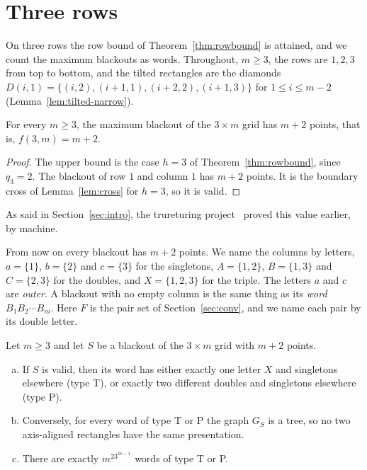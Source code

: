 \section{Three rows}\label{sec:three}

On three rows the row bound of Theorem~\ref{thm:rowbound} is attained, and we count the
maximum blackouts as words. Throughout, $m\ge3$, the rows are $1,2,3$ from top to bottom, and the
tilted rectangles are the diamonds $D(i,1)=\{(i,2),(i+1,1),(i+2,2),(i+1,3)\}$ for
$1\le i\le m-2$ (Lemma~\ref{lem:tilted-narrow}).

\begin{theorem}\label{thm:threevalue}
For every $m\ge3$, the maximum blackout of the $3\times m$ grid has $m+2$ points, that is,
$f(3,m)=m+2$.
\end{theorem}

\begin{proof}
The upper bound is the case $h=3$ of Theorem~\ref{thm:rowbound}, since $q_3=2$. The blackout
of row $1$ and column $1$ has $m+2$ points. It is the boundary cross of Lemma~\ref{lem:cross}
for $h=3$, so it is valid.
\end{proof}

As said in Section~\ref{sec:intro}, the trureturing project~\cite{trureturing2026} proved this
value earlier, by machine.

From now on every blackout has $m+2$ points. We name the columns by letters, $a=\{1\}$,
$b=\{2\}$ and $c=\{3\}$ for the singletons, $A=\{1,2\}$, $B=\{1,3\}$ and $C=\{2,3\}$ for the
doubles, and $X=\{1,2,3\}$ for the triple. The letters $a$ and $c$ are \emph{outer}. A blackout
with no empty column is the same thing as its \emph{word} $B_1B_2\cdots B_m$. Here $F$ is the
pair set of Section~\ref{sec:conv}, and we name each pair by its double letter.

\begin{proposition}\label{prop:threeclass}
Let $m\ge3$ and let $S$ be a blackout of the $3\times m$ grid with $m+2$ points.
\begin{enumerate}[(a)]
\item If $S$ is valid, then its word has either exactly one letter $X$ and singletons elsewhere
(type T), or exactly two different doubles and singletons elsewhere (type P).
\item Conversely, for every word of type T or P the graph $G_S$ is a tree, so no two
axis-aligned rectangles have the same presentation.
\item There are exactly $m^23^{m-1}$ words of type T or P.
\end{enumerate}
\end{proposition}


